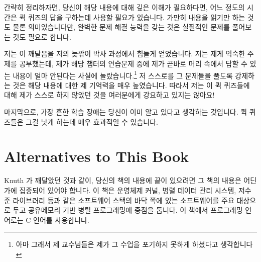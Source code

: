 간략히 정리하자면, 당신이 해당 내용에 대해 깊은 이해가 필요하다면, 어느 정도의
시간은 퀵 퀴즈의 답을 구하는데 사용할 필요가 있습니다.
가만히 내용을 읽기만 하는 것도 물론 의미있습니다만, 완벽한 문제 해결 능력을
갖는 것은 실질적인 문제를 풀어보는 것도 필요로 합니다.

\iffalse
In short, if you need a deep
understanding of the material, then you should invest some time
into answering the Quick Quizzes.
Don't get me wrong, passively reading the material can be quite
valuable, but gaining full problem-solving capability really
does require that you practice solving problems.
\fi

저는 이 깨달음을 저의 늦깎이 박사 과정에서 힘들게 얻었습니다.  저는 제게 익숙한
주제를 공부했는데, 제가 해당 챕터의 연습문제 중에 제가 곧바로 머리 속에서 답할
수 있는 내용이 얼마 안된다는 사실에 놀랐습니다.\footnote{ 아마 그래서 제
교수님들은 제가 그 수업을 포기하지 못하게 하셨다고 생각합니다} 저 스스로를 그
문제들을 풀도록 강제하는 것은 해당 내용에 대한 제 기억력을 매우 높였습니다.
따라서 저는 이 퀵 퀴즈들에 대해 제가 스스로 하지 않았던 것을 여러분에게
강요하고 있지는 않아요!

마지막으로, 가장 흔한 학습 장애는 당신이 이미 알고 있다고 생각하는 것입니다.
퀵 퀴즈들은 그걸 낫게 하는데 매우 효과적일 수 있습니다.

\iffalse
I learned this the hard way during coursework for my late-in-life
Ph.D.
I was studying a familiar topic, and was surprised at how few of
the chapter's exercises I could answer off the top of my head.\footnote{
	So I suppose that it was just as well that my professors refused
	to let me waive that class!}
Forcing myself to answer the questions greatly increased my
retention of the material.
So with these Quick Quizzes I am not asking you to do anything
that I have not been doing myself!

Finally, the most common learning disability is thinking that
you already know.
The quick quizzes can be an extremely effective cure.
\fi

\section{Alternatives to This Book}
\label{sec:Alternatives to This Book}

Knuth 가 깨달았던 것과 같이, 당신의 책의 내용에 끝이 있으려면 그 책의 내용은
어딘가에 집중되어 있어야 합니다.  이 책은 운영체제 커널, 병렬 데이터 관리
시스템, 저수준 라이브러리 등과 같은 소프트웨어 스택의 바닥 쪽에 있는
소프트웨어를 주요 대상으로 두고 공유메모리 기반 병렬 프로그래밍에 중점을
둡니다.
이 책에서 프로그래밍 언어로는 C 언어를 사용합니다.

